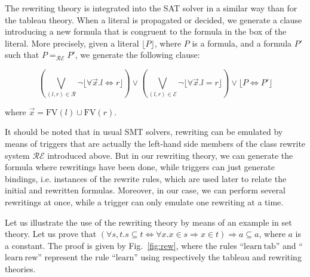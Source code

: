 The rewriting theory is integrated into the SAT solver in a similar way than for
the tableau theory. When a literal is propagated or decided, we generate a
clause introducing a new formula that is congruent to the formula in the box of
the literal. More precisely, given a literal $\lfloor{}P\rfloor$, where $P$ is a
formula, and a formula $P'$ such that $P=_\mathcal{RE}P'$, we generate the
following clause:

$$\left(\bigvee_{(l,r)\in\mathcal{R}}
\neg\lfloor\forall{}\vec{x}.l\Leftrightarrow{}r\rfloor\right)\lor
\left(\bigvee_{(l,r)\in\mathcal{E}}\neg\lfloor\forall{}\vec{x}.l=r\rfloor\right)\lor
\lfloor{}P\Leftrightarrow{}P'\rfloor$$

where $\vec{x}=\mathrm{FV}(l)\cup\mathrm{FV}(r)$.

It should be noted that in usual SMT solvers, rewriting can be emulated by means
of triggers that are actually the left-hand side members of the class rewrite
system $\mathcal{RE}$ introduced above. But in our rewriting theory, we can
generate the formula where rewritings have been done, while triggers can just
generate bindings, i.e. instances of the rewrite rules, which are used later to
relate the initial and rewritten formulas. Moreover, in our case, we can perform
several rewritings at once, while a trigger can only emulate one rewriting at a
time.

Let us illustrate the use of the rewriting theory by means of an example in set
theory. Let us prove that
$(\forall{}s,t.s\subseteq{}t\Leftrightarrow{}\forall{}x.x\in{}s\Rightarrow{}
x\in{}t)\Rightarrow{}a\subseteq{}a$, where $a$ is a constant. The proof is given
by Fig.~\ref{fig:rew}, where the rules ``$\mathrm{learn~tab}$'' and
``$\mathrm{learn~rew}$'' represent the rule ``$\mathrm{learn}$'' using
respectively the tableau and rewriting theories.

